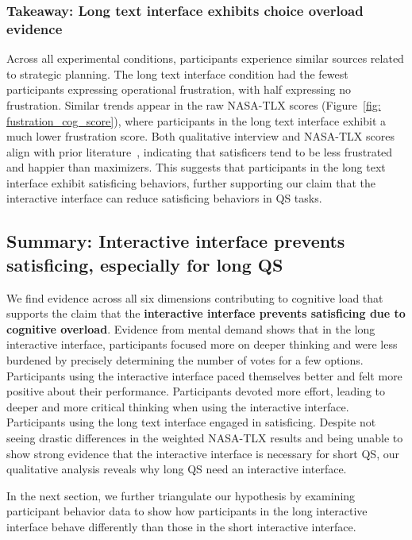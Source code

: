 \subsubsection{Takeaway: Long text interface exhibits choice overload evidence}
Across all experimental conditions, participants experience similar sources related to strategic planning. The long text interface condition had the fewest participants expressing operational frustration, with half expressing no frustration. Similar trends appear in the raw NASA-TLX scores (Figure~\ref{fig: fustration_cog_score}), where participants in the long text interface exhibit a much lower frustration score. Both qualitative interview and NASA-TLX scores align with prior literature~\cite{polmanWhyAreMaximizers2010, schwartzMaximizingSatisficingHappiness2002}, indicating that satisficers tend to be less frustrated and happier than maximizers. This suggests that participants in the long text interface exhibit satisficing behaviors, further supporting our claim that the interactive interface can reduce satisficing behaviors in QS tasks.

\subsection{Summary: Interactive interface prevents satisficing, especially for long QS}
We find evidence across all six dimensions contributing to cognitive load that supports the claim that the \textbf{interactive interface prevents satisficing due to cognitive overload}. Evidence from mental demand shows that in the long interactive interface, participants focused more on deeper thinking and were less burdened by precisely determining the number of votes for a few options. Participants using the interactive interface paced themselves better and felt more positive about their performance. Participants devoted more effort, leading to deeper and more critical thinking when using the interactive interface. Participants using the long text interface engaged in satisficing. Despite not seeing drastic differences in the weighted NASA-TLX results and being unable to show strong evidence that the interactive interface is necessary for short QS, our qualitative analysis reveals why long QS need an interactive interface.

In the next section, we further triangulate our hypothesis by examining participant behavior data to show how participants in the long interactive interface behave differently than those in the short interactive interface.



